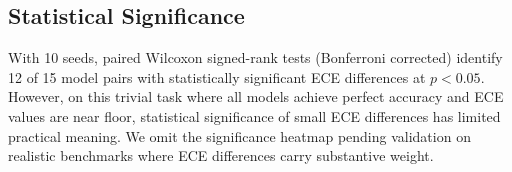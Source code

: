 \documentclass[11pt]{article}
\begin{document}
\subsection{Statistical Significance}

With 10 seeds, paired Wilcoxon signed-rank tests (Bonferroni corrected) identify 12 of 15 model pairs with statistically significant ECE differences at $p < 0.05$. However, on this trivial task where all models achieve perfect accuracy and ECE values are near floor, statistical significance of small ECE differences has limited practical meaning. We omit the significance heatmap pending validation on realistic benchmarks where ECE differences carry substantive weight.
\end{document}

